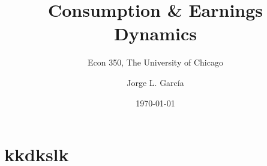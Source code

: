 

\title{Consumption \& Earnings Dynamics}
\subtitle{Econ 350, The University of Chicago}
\author{Jorge L. Garc\'{i}a}
\date{\today}






\begin{frame}[plain]
	\titlepage
\end{frame}



\section{kkdkslk}


